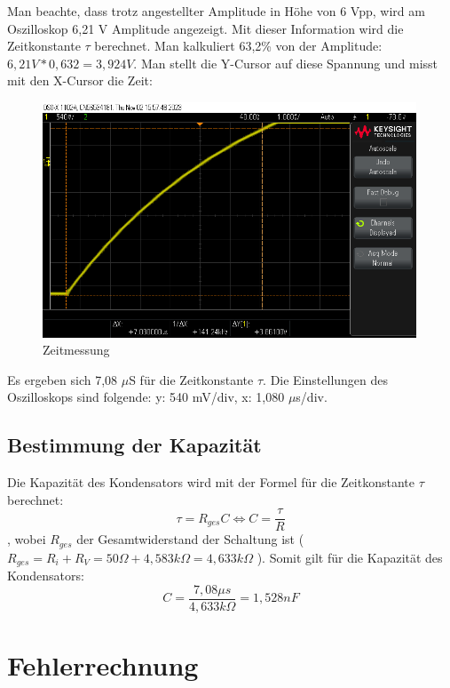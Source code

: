 Man beachte, dass trotz angestellter Amplitude in Höhe von
6 Vpp, wird am Oszilloskop 6,21 V Amplitude angezeigt. Mit dieser 
Information wird die Zeitkonstante $\tau$ berechnet. Man kalkuliert
63,2\% von der Amplitude: $6,21V * 0,632 = 3,924V$. Man stellt die 
Y-Cursor auf diese Spannung und misst mit den X-Cursor die Zeit:
\begin{figure}[H]
	\centering
	\includegraphics[height=7cm]{images/Versuch1/Zeitmessung.png} 
	\caption{Zeitmessung}
	\label{fig: Zeitmessung}
\end{figure}

Es ergeben sich 7,08 $\mu$S für die Zeitkonstante $\tau$. Die
Einstellungen des Oszilloskops sind folgende:
y: 540 mV/div, x: 1,080 $\mu$s/div.

\subsection{Bestimmung der Kapazität}

Die Kapazität des Kondensators wird mit der Formel für die Zeitkonstante $\tau$
berechnet:
\[
	\tau = R_{ges}C \Leftrightarrow C = \frac{\tau}{R}
\], wobei $R_{ges}$ der Gesamtwiderstand der Schaltung ist
($R_{ges} = R_{i} + R_{V} = 50\Omega + 4,583 k\Omega = 4,633 k\Omega$ ).
Somit gilt für die Kapazität des Kondensators:
\[
	C = \frac{7,08 \mu s}{4,633 k\Omega} = 1,528 nF
\]


\section{Fehlerrechnung}





